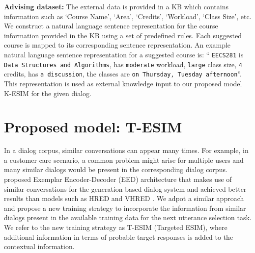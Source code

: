 \documentclass[letterpaper]{article} %
\begin{document}
\textbf{Advising dataset:} The external data is provided in a KB which contains information such as `Course Name', `Area', `Credits', `Workload', `Class Size', etc. 
We construct a natural language sentence representation for the course information provided in the KB using a set of predefined rules. 
Each suggested course is mapped to its corresponding sentence representation. An example natural language sentence representation for a suggested course is: `` \texttt{EECS281} is \texttt{Data Structures and Algorithms}, has \texttt{moderate} workload,  \texttt{large} class size, \texttt{4} credits, has \texttt{a discussion}, the classes are \texttt{on Thursday, Tuesday afternoon}''. This representation is used as external knowledge input to our proposed model K-ESIM for the given dialog.

\section{Proposed model: T-ESIM}
\label{proposed-model-t-esim}
In a dialog corpus, similar conversations can appear many times. For example, in a customer care scenario, a common problem might arise for multiple users and many similar dialogs would be present in the corresponding dialog corpus. \citeauthor{pandey2018exemplar}  proposed Exemplar Encoder-Decoder (EED) architecture that makes use of similar conversations for the generation-based dialog system and achieved better results than models such as HRED \cite{serban2016building} and VHRED \cite{serban2017hierarchical}. We adpot a similar approach and propose a new training strategy to incorporate the information from similar dialogs present in the available training data for the next utterance selection task. We refer to the new training strategy as T-ESIM (Targeted ESIM), where additional information in terms of probable target responses is added to the contextual information. 
\end{document}
